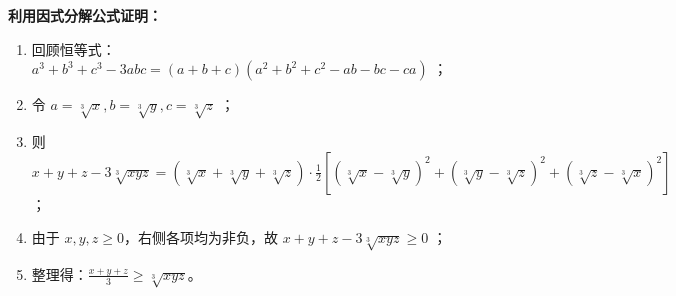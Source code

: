 \begin{proofbox}
\textbf{利用因式分解公式证明：}
\begin{enumerate}
    \item 回顾恒等式：$a^3+b^3+c^3-3abc = (a+b+c)(a^2+b^2+c^2-ab-bc-ca)$ ；
    \item 令 $a = \sqrt[3]{x}, b = \sqrt[3]{y}, c = \sqrt[3]{z}$ ；
    \item 则 $x+y+z - 3\sqrt[3]{xyz} = (\sqrt[3]{x}+\sqrt[3]{y}+\sqrt[3]{z}) \cdot \frac{1}{2}[(\sqrt[3]{x}-\sqrt[3]{y})^2 + (\sqrt[3]{y}-\sqrt[3]{z})^2 + (\sqrt[3]{z}-\sqrt[3]{x})^2]$ ；
    \item 由于 $x,y,z \geqslant 0$，右侧各项均为非负，故 $x+y+z - 3\sqrt[3]{xyz} \geqslant 0$ ；
    \item 整理得：$\frac{x+y+z}{3} \geqslant \sqrt[3]{xyz}$。
\end{enumerate}
\end{proofbox}
